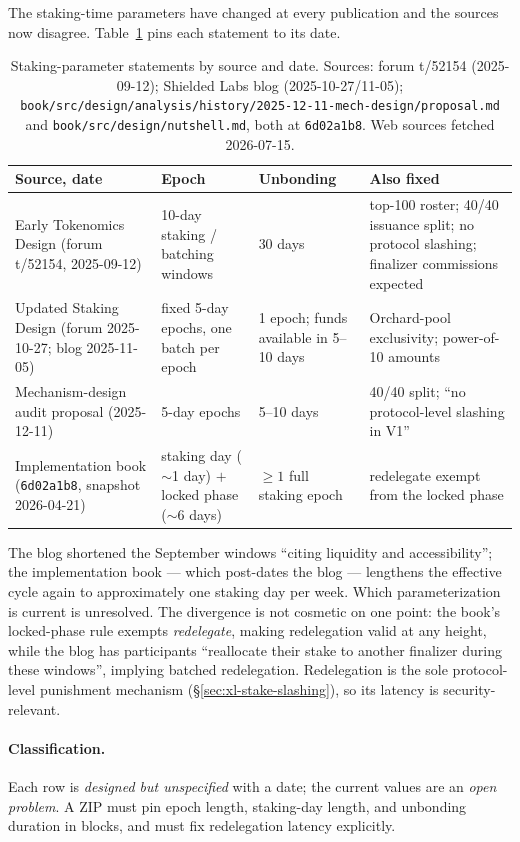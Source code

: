 \documentclass[11pt,a4paper]{article}
\theoremstyle{definition}
\begin{document}
The staking-time parameters have changed at every publication and the
sources now disagree. Table~\ref{tab:xl-stake-params} pins each statement
to its date.

\begin{table}[htbp]
\centering
\small
\begin{tabular}{@{}p{3.6cm}p{3.6cm}p{2.9cm}p{4.1cm}@{}}
\toprule
Source, date & Epoch & Unbonding & Also fixed \\
\midrule
Early Tokenomics Design (forum t/52154, 2025-09-12)
  & 10-day staking / batching windows
  & 30 days
  & top-100 roster; 40/40 issuance split; no protocol slashing;
    finalizer commissions expected \\
Updated Staking Design (forum 2025-10-27; blog 2025-11-05)
  & fixed 5-day epochs, one batch per epoch
  & 1 epoch; funds available in 5--10 days
  & Orchard-pool exclusivity; power-of-10 amounts \\
Mechanism-design audit proposal (2025-12-11)
  & 5-day epochs
  & 5--10 days
  & 40/40 split; ``no protocol-level slashing in V1'' \\
Implementation book (\texttt{6d02a1b8}, snapshot 2026-04-21)
  & staking day ($\sim$1 day) $+$ locked phase ($\sim$6 days)
  & $\geq 1$ full staking epoch
  & redelegate exempt from the locked phase \\
\bottomrule
\end{tabular}
\caption{Staking-parameter statements by source and date. Sources:
forum t/52154 (2025-09-12); Shielded Labs blog (2025-10-27/11-05);
\texttt{book/src/design/analysis/history/2025-12-11-mech-design/proposal.md}
and \texttt{book/src/design/nutshell.md}, both at \texttt{6d02a1b8}. Web
sources fetched 2026-07-15.}
\label{tab:xl-stake-params}
\end{table}

The blog shortened the September windows ``citing liquidity and
accessibility''; the implementation book --- which post-dates the blog ---
lengthens the effective cycle again to approximately one staking day per
week. Which parameterization is current is unresolved. The divergence is
not cosmetic on one point: the book's locked-phase rule exempts
\emph{redelegate}, making redelegation valid at any height, while the
blog has participants ``reallocate their stake to another finalizer
during these windows'', implying batched redelegation. Redelegation is
the sole protocol-level punishment mechanism
(\S\ref{sec:xl-stake-slashing}), so its latency is security-relevant.

\paragraph{Classification.} Each row is \emph{designed but unspecified}
with a date; the current values are an \emph{open problem}. A ZIP must
pin epoch length, staking-day length, and unbonding duration in blocks,
and must fix redelegation latency explicitly.
\end{document}
